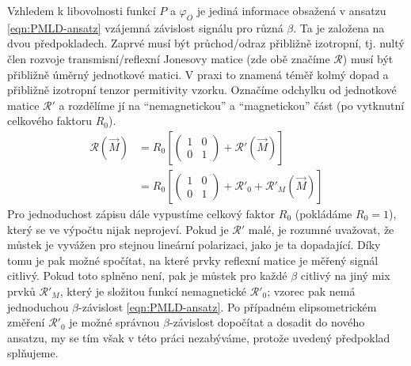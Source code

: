 Vzhledem k libovolnosti funkcí $P$ a $\varphi_O$ je jediná informace obsažená v ansatzu \eqref{eqn:PMLD-ansatz} vzájemná závislost signálu pro různá $\beta$.
Ta je založena na dvou předpokladech.
Zaprvé musí být průchod/odraz přibližně izotropní, tj. nultý člen rozvoje transmisní/reflexní Jonesovy matice (zde obě značíme $\mathcal{R}$) musí být přibližně úměrný jednotkové matici.
V praxi to znamená téměř kolmý dopad a přibližně izotropní tenzor permitivity vzorku.
Označíme odchylku od jednotkové matice $\mathcal{R}'$ a rozdělíme jí na ``nemagnetickou'' a ``magnetickou'' část (po vytknutní celkového faktoru $R_0$).
\begin{align}
\label{eqn:PMLD-Jones}
\mathcal{R}(\vec{M}) &= R_0 \left[ \begin{pmatrix} 1&0\\0&1 \end{pmatrix} + \mathcal{R}'(\vec{M}) \right] \\
                     &= R_0 \left[ \begin{pmatrix} 1&0\\0&1 \end{pmatrix} + \mathcal{R}'_0 + \mathcal{R}'_M(\vec{M}) \right]
\end{align}
Pro jednoduchost zápisu dále vypustíme celkový faktor $R_0$ (pokládáme $R_0=1$), který se ve výpočtu nijak neprojeví.
Pokud je $\mathcal{R}'$ malé, je rozumné uvažovat, že můstek je vyvážen pro stejnou lineární polarizaci, jako je ta dopadající.
Díky tomu je pak možné spočítat, na které prvky reflexní matice je měřený signál citlivý.
Pokud toto splněno není, pak je můstek pro každé $\beta$ citlivý na jiný mix prvků $\mathcal{R}'_M$, který je složitou funkcí nemagnetické $\mathcal{R}'_0$; vzorec pak nemá jednoduchou $\beta$-závislost \eqref{eqn:PMLD-ansatz}.
Po případném elipsometrickém změření $\mathcal{R}'_0$ je možné správnou $\beta$-závislost dopočítat a dosadit do nového ansatzu, my se tím však v této práci nezabýváme, protože uvedený předpoklad splňujeme.

